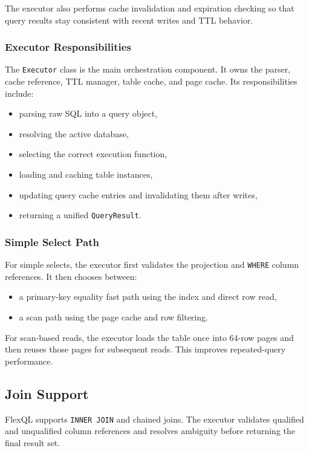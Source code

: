 \documentclass[12pt,a4paper]{article}
\begin{document}
The executor also performs cache invalidation and expiration checking so that
query results stay consistent with recent writes and TTL behavior.

\subsubsection{Executor Responsibilities}

The \texttt{Executor} class is the main orchestration component. It owns the
parser, cache reference, TTL manager, table cache, and page cache. Its
responsibilities include:

\begin{itemize}[leftmargin=1.8em]
  \item parsing raw SQL into a query object,
  \item resolving the active database,
  \item selecting the correct execution function,
  \item loading and caching table instances,
  \item updating query cache entries and invalidating them after writes,
  \item returning a unified \texttt{QueryResult}.
\end{itemize}

\subsubsection{Simple Select Path}

For simple selects, the executor first validates the projection and
\texttt{WHERE} column references. It then chooses between:

\begin{itemize}[leftmargin=1.8em]
  \item a primary-key equality fast path using the index and direct row read,
  \item a scan path using the page cache and row filtering.
\end{itemize}

For scan-based reads, the executor loads the table once into 64-row pages and
then reuses those pages for subsequent reads. This improves repeated-query
performance.

\subsection{Join Support}

FlexQL supports \texttt{INNER JOIN} and chained joins. The executor validates
qualified and unqualified column references and resolves ambiguity before
returning the final result set.
\end{document}
